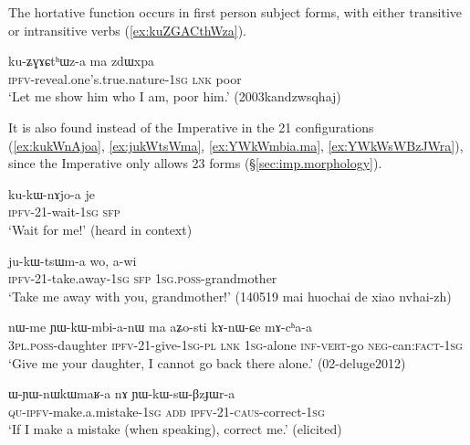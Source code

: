 The hortative function occurs in first person subject forms, with either transitive or intransitive verbs (\ref{ex:kuZGACthWza}).

\begin{exe}
\ex \label{ex:kuZGACthWza}
\gll ku-ʑɣɤɕtʰɯz-a ma zdɯxpa \\
\textsc{ipfv}-reveal.one's.true.nature-\textsc{1sg} \textsc{lnk} poor \\
\glt `Let me show him who I am, poor him.' (2003kandzwsqhaj)
\end{exe}

It is also found instead of the Imperative in the 2\fl{}1 configurations (\ref{ex:kukWnAjoa}, \ref{ex:jukWtsWma}, \ref{ex:YWkWmbia.ma}, \ref{ex:YWkWsWBzJWra}), since the Imperative only allows 2\fl{}3 forms (§\ref{sec:imp.morphology}).

\begin{exe}
	\ex \label{ex:kukWnAjoa}
	\gll ku-kɯ-nɤjo-a je \\
	\textsc{ipfv}-2\fl{}1-wait-\textsc{1sg} \textsc{sfp}  \\
	\glt `Wait for me!' (heard in context)
\end{exe}

\begin{exe}
\ex \label{ex:jukWtsWma}
\gll ju-kɯ-tsɯm-a wo, a-wi \\
\textsc{ipfv}-2\fl{}1-take.away-\textsc{1sg} \textsc{sfp} \textsc{1sg}.\textsc{poss}-grandmother \\
\glt `Take me away with you, grandmother!' (140519 mai huochai de xiao nvhai-zh) 
\end{exe}

\begin{exe}
\ex \label{ex:YWkWmbia.ma}
\gll  nɯ-me ɲɯ-kɯ-mbi-a-nɯ ma aʑo-sti kɤ-nɯ-ɕe mɤ-cʰa-a \\
\textsc{3pl}.\textsc{poss}-daughter \textsc{ipfv}-2\fl{}1-give-\textsc{1sg}-\textsc{pl} \textsc{lnk} \textsc{1sg}-alone \textsc{inf}-\textsc{vert}-go \textsc{neg}-can:\textsc{fact}-\textsc{1sg} \\
\glt `Give me your daughter, I cannot go back there alone.' (02-deluge2012)
\end{exe}

\begin{exe}
\ex \label{ex:YWkWsWBzJWra}
\gll ɯ-ɲɯ-nɯkɯmaʁ-a nɤ ɲɯ-kɯ-sɯ-βzɟɯr-a \\
\textsc{qu}-\textsc{ipfv}-make.a.mistake-\textsc{1sg} \textsc{add} \textsc{ipfv}-2\fl{}1-\textsc{caus}-correct-\textsc{1sg} \\
\glt `If I make a mistake (when speaking), correct me.' (elicited)
\end{exe}

